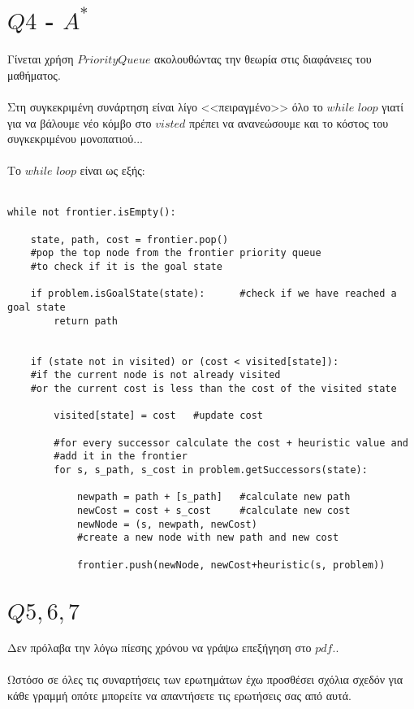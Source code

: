 \documentclass[12pt]{article}
\begin{document}
\section*{$Q4$ - $A^*$}
Γίνεται χρήση $PriorityQueue$ ακολουθώντας την θεωρία στις διαφάνειες του μαθήματος.\\\\
Στη συγκεκριμένη συνάρτηση είναι λίγο <<πειραγμένο>> όλο το $while$ $loop$ γιατί για να βάλουμε νέο κόμβο στο $visted$ πρέπει να ανανεώσουμε και το κόστος του συγκεκριμένου μονοπατιού...\\\\
Το $while$ $loop$ είναι ως εξής:\\\\
\begin{otherlanguage}{english}
\begin{verbatim}
while not frontier.isEmpty():

    state, path, cost = frontier.pop()  
    #pop the top node from the frontier priority queue 
    #to check if it is the goal state

    if problem.isGoalState(state):      #check if we have reached a goal state
        return path


    if (state not in visited) or (cost < visited[state]):   
    #if the current node is not already visited 
    #or the current cost is less than the cost of the visited state

        visited[state] = cost   #update cost
            
        #for every successor calculate the cost + heuristic value and
        #add it in the frontier
        for s, s_path, s_cost in problem.getSuccessors(state):

            newpath = path + [s_path]   #calculate new path
            newCost = cost + s_cost     #calculate new cost
            newNode = (s, newpath, newCost)     
            #create a new node with new path and new cost

            frontier.push(newNode, newCost+heuristic(s, problem))
\end{verbatim}
\end{otherlanguage}
\section*{$Q5,6,7$}
Δεν πρόλαβα την λόγω πίεσης χρόνου να γράψω επεξήγηση στο $pdf$..\\\\
Ωστόσο σε όλες τις συναρτήσεις των ερωτημάτων έχω προσθέσει σχόλια σχεδόν για κάθε γραμμή οπότε μπορείτε να απαντήσετε τις ερωτήσεις σας από αυτά.
\end{document}
